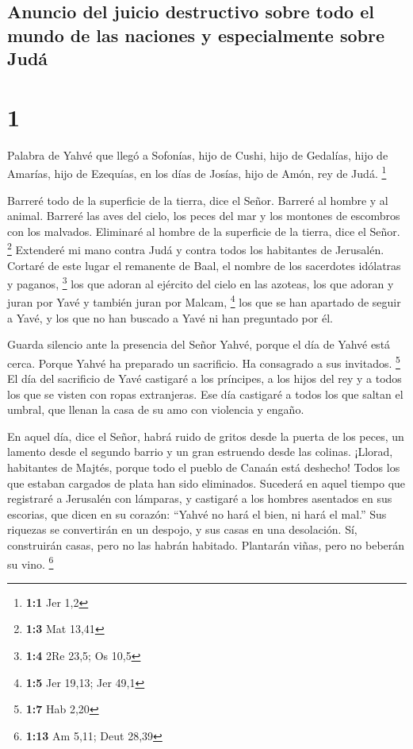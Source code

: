 \hypertarget{anuncio-del-juicio-destructivo-sobre-todo-el-mundo-de-las-naciones-y-especialmente-sobre-juduxe1}{%
\subsection{Anuncio del juicio destructivo sobre todo el mundo de las
naciones y especialmente sobre
Judá}\label{anuncio-del-juicio-destructivo-sobre-todo-el-mundo-de-las-naciones-y-especialmente-sobre-juduxe1}}

\hypertarget{section}{%
\section{1}\label{section}}

 Palabra de Yahvé que llegó a Sofonías, hijo de Cushi,
hijo de Gedalías, hijo de Amarías, hijo de Ezequías, en los días de
Josías, hijo de Amón, rey de Judá. \footnote{\textbf{1:1} Jer 1,2}

 Barreré todo de la superficie de la tierra, dice el
Señor.  Barreré al hombre y al animal. Barreré las aves
del cielo, los peces del mar y los montones de escombros con los
malvados. Eliminaré al hombre de la superficie de la tierra, dice el
Señor. \footnote{\textbf{1:3} Mat 13,41}  Extenderé mi
mano contra Judá y contra todos los habitantes de Jerusalén. Cortaré de
este lugar el remanente de Baal, el nombre de los sacerdotes idólatras y
paganos, \footnote{\textbf{1:4} 2Re 23,5; Os 10,5}  los
que adoran al ejército del cielo en las azoteas, los que adoran y juran
por Yavé y también juran por Malcam, \footnote{\textbf{1:5} Jer 19,13;
  Jer 49,1}  los que se han apartado de seguir a Yavé, y
los que no han buscado a Yavé ni han preguntado por él.

 Guarda silencio ante la presencia del Señor Yahvé, porque
el día de Yahvé está cerca. Porque Yahvé ha preparado un sacrificio. Ha
consagrado a sus invitados. \footnote{\textbf{1:7} Hab 2,20}
 El día del sacrificio de Yavé castigaré a los príncipes,
a los hijos del rey y a todos los que se visten con ropas extranjeras.
 Ese día castigaré a todos los que saltan el umbral, que
llenan la casa de su amo con violencia y engaño.

 En aquel día, dice el Señor, habrá ruido de gritos desde
la puerta de los peces, un lamento desde el segundo barrio y un gran
estruendo desde las colinas.  ¡Llorad, habitantes de
Majtés, porque todo el pueblo de Canaán está deshecho! Todos los que
estaban cargados de plata han sido eliminados.  Sucederá
en aquel tiempo que registraré a Jerusalén con lámparas, y castigaré a
los hombres asentados en sus escorias, que dicen en su corazón: ``Yahvé
no hará el bien, ni hará el mal.''  Sus riquezas se
convertirán en un despojo, y sus casas en una desolación. Sí,
construirán casas, pero no las habrán habitado. Plantarán viñas, pero no
beberán su vino. \footnote{\textbf{1:13} Am 5,11; Deut 28,39}

